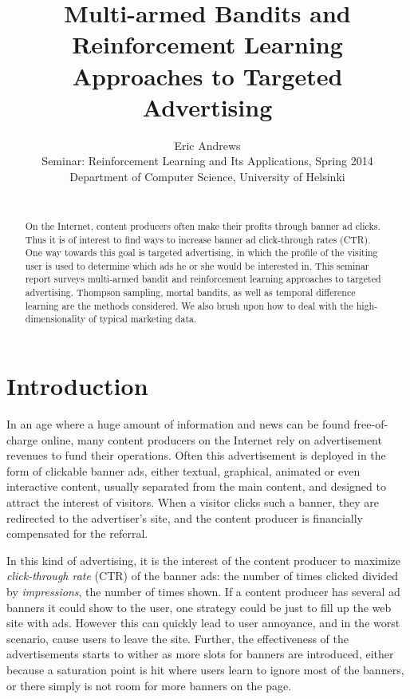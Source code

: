 \documentclass{article} %
\title{Multi-armed Bandits and Reinforcement Learning Approaches to Targeted
Advertising}
\author{
Eric Andrews \\
Seminar: Reinforcement Learning and Its Applications, Spring 2014 \\
Department of Computer Science, University of Helsinki\\\\
}
\begin{document}
\maketitle

\begin{abstract}
  On the Internet, content producers often make their profits through banner ad
  clicks. Thus it is of interest to find ways to increase banner ad
  click-through rates (CTR). One way towards this goal is targeted advertising,
  in which the profile of the visiting user is used to determine which ads he
  or she would be interested in. This seminar report surveys multi-armed bandit
  and reinforcement learning approaches to targeted advertising. Thompson
  sampling, mortal bandits, as well as temporal difference learning are the
  methods considered. We also brush upon how to deal with the
  high-dimensionality of typical marketing data.
\end{abstract}

\section{Introduction}

In an age where a huge amount of information and news can be found
free-of-charge online, many content producers on the Internet rely on
advertisement revenues to fund their operations. Often this advertisement is
deployed in the form of clickable banner ads, either textual, graphical,
animated or even interactive content, usually separated from the main content,
and designed to attract the interest of visitors. When a visitor clicks such a
banner, they are redirected to the advertiser's site, and the content producer
is financially compensated for the referral.

In this kind of advertising, it is the interest of the content producer to
maximize \emph{click-through rate} (CTR) of the banner ads: the number of times
clicked divided by \emph{impressions}, the number of times shown. If a content
producer has several ad banners it could show to the user, one strategy could
be just to fill up the web site with ads. However this can quickly lead to user
annoyance, and in the worst scenario, cause users to leave the site. Further,
the effectiveness of the advertisements starts to wither as more slots for
banners are introduced, either because a saturation point is hit where users
learn to ignore most of the banners, or there simply is not room for more
banners on the page.
\end{document}
